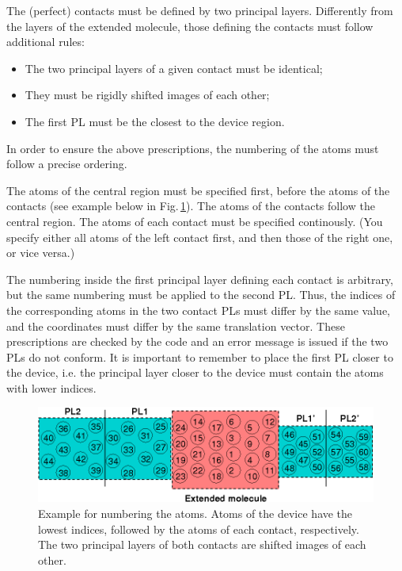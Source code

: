 \documentclass[a4paper,11pt,english]{sphinxmanual}
\begin{document}
{The (perfect) contacts must be defined by two principal layers. Differently from the layers of the extended molecule, those defining the contacts must follow additional rules:
%
\begin{itemize}
\item The two principal layers of a given contact must be identical;
\item They must be rigidly shifted images of each other;
\item The first PL must be the closest to the device region.
\end{itemize}

In order to ensure the above prescriptions, the numbering of the atoms must follow a precise ordering.

The atoms of the central region must be specified first, before the atoms of the contacts (see example below in Fig.\,\ref{device_numbering}). The atoms of the contacts follow the central region. The atoms of each contact must be specified continously. (You specify either all atoms of the left contact first, and then those of the right one, or vice versa.)

The numbering inside the first principal layer defining each contact is arbitrary, but the same numbering must be applied to the second PL. Thus, the indices of the corresponding atoms in the two contact PLs must differ by the same value, and the coordinates must differ by the same translation vector. These prescriptions are checked by the code and an error message is issued if the two PLs do not conform. It is important to remember to place the first PL closer to the device, i.e. the principal layer closer to the device must contain the atoms with lower indices.

\begin{figure}[htbp]
\centering
\capstart
\includegraphics[width=0.8\linewidth]{device_numbering.png}
\caption{Example for numbering the atoms. Atoms of the device have the lowest indices, followed by the atoms of each contact, respectively. The two principal layers of both contacts are shifted images of each other.}
\label{device_numbering}
\end{figure}

}
\end{document}
